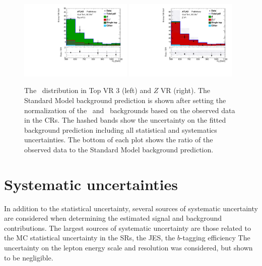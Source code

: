 \begin{figure}
  \centering
  \includegraphics[width=0.48\textwidth]{figs/blstop/vr_top_3_ht_signal.pdf}
  \includegraphics[width=0.48\textwidth]{figs/blstop/vr_Z_ht_signal.pdf}
  \caption{The \HT\ distribution in Top VR 3 (left) and $Z$ VR (right).
    The Standard Model background prediction is shown after setting the
    normalization of the \TTBAR\ and \ZGAMMAJETS\ backgrounds based on the
    observed data in the CRs.
    The hashed bands show the uncertainty on the fitted background prediction
    including all statistical and systematics uncertainties.
    The bottom of each plot shows the ratio of the observed data to the
    Standard Model background prediction.
  }
  \label{fig:ht_vr}
\end{figure}


\section{Systematic uncertainties}
\label{sec:systematics}

In addition to the statistical uncertainty, several sources of systematic
uncertainty are considered when determining the estimated signal and background
contributions.
The largest sources of systematic uncertainty are those related to the
MC statistical uncertainty in the SRs, the JES, the $b$-tagging efficiency
The uncertainty on the lepton energy scale and resolution was considered,
but shown to be negligible.

